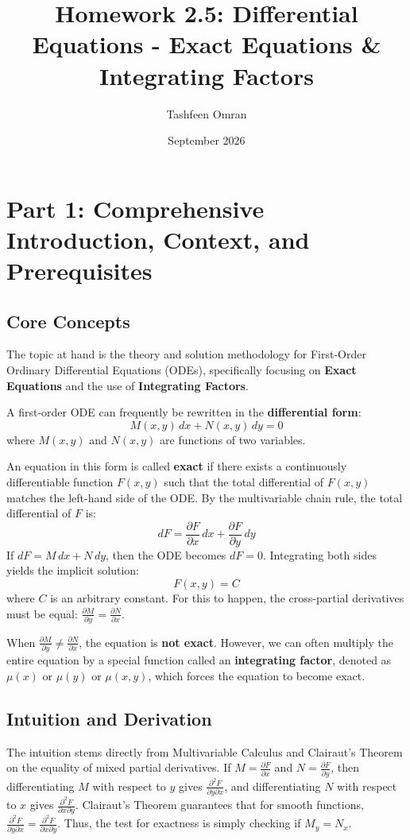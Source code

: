 \documentclass[11pt]{article}
\title{\textbf{Homework 2.5: Differential Equations - Exact Equations \& Integrating Factors}}
\author{Tashfeen Omran}
\date{September 2026}
\begin{document}
\maketitle
\tableofcontents
\newpage

\section{Part 1: Comprehensive Introduction, Context, and Prerequisites}

\subsection{Core Concepts}
The topic at hand is the theory and solution methodology for First-Order Ordinary Differential Equations (ODEs), specifically focusing on \textbf{Exact Equations} and the use of \textbf{Integrating Factors}. 

A first-order ODE can frequently be rewritten in the \textbf{differential form}:
\[ M(x, y) \, dx + N(x, y) \, dy = 0 \]
where $M(x,y)$ and $N(x,y)$ are functions of two variables. 

An equation in this form is called \textbf{exact} if there exists a continuously differentiable function $F(x, y)$ such that the total differential of $F(x, y)$ matches the left-hand side of the ODE. By the multivariable chain rule, the total differential of $F$ is:
\[ dF = \frac{\partial F}{\partial x} \, dx + \frac{\partial F}{\partial y} \, dy \]
If $dF = M \, dx + N \, dy$, then the ODE becomes $dF = 0$. Integrating both sides yields the implicit solution:
\[ F(x, y) = C \]
where $C$ is an arbitrary constant. For this to happen, the cross-partial derivatives must be equal: $\frac{\partial M}{\partial y} = \frac{\partial N}{\partial x}$.

When $\frac{\partial M}{\partial y} \neq \frac{\partial N}{\partial x}$, the equation is \textbf{not exact}. However, we can often multiply the entire equation by a special function called an \textbf{integrating factor}, denoted as $\mu(x)$ or $\mu(y)$ or $\mu(x,y)$, which forces the equation to become exact.

\subsection{Intuition and Derivation}
The intuition stems directly from Multivariable Calculus and Clairaut's Theorem on the equality of mixed partial derivatives. If $M = \frac{\partial F}{\partial x}$ and $N = \frac{\partial F}{\partial y}$, then differentiating $M$ with respect to $y$ gives $\frac{\partial^2 F}{\partial y \partial x}$, and differentiating $N$ with respect to $x$ gives $\frac{\partial^2 F}{\partial x \partial y}$. Clairaut's Theorem guarantees that for smooth functions, $\frac{\partial^2 F}{\partial y \partial x} = \frac{\partial^2 F}{\partial x \partial y}$. Thus, the test for exactness is simply checking if $M_y = N_x$.
\end{document}
